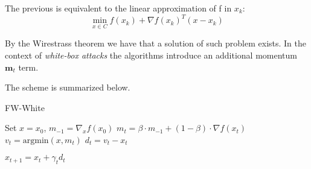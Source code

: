 \documentclass[10pt,twocolumn,letterpaper, english]{article}
\theoremstyle{definition}
\theoremstyle{plain}
\theoremstyle{plain}
\theoremstyle{plain}
\theoremstyle{plain}
\theoremstyle{remark}
\theoremstyle{remark}
\theoremstyle{definition}
\theoremstyle{definition}
\theoremstyle{definition}
\theoremstyle{definition}
\begin{document}
The previous is equivalent to the linear approximation of f in $x_k$:
\begin{equation*}
    \min_{x \in C} f(x_k) + \nabla f(x_k)^T (x-x_k)
\end{equation*}

By the Wirestrass theorem we have that a solution of such problem exists.
In the context of \textit{white-box attacks} the algorithms introduce an additional momentum $\textbf{m}_t$ term. 

The scheme is summarized below.
\begin{algorithm}
\caption{FW-White}\label{FW}
\begin{algorithmic}[1]

\State Set $x = x_0$, $m_{-1} = \nabla_x f(x_0)$
    \State $m_t = \beta \cdot m_{-1} + (1-\beta) \cdot \nabla f(x_t) $
    \State $v_t = \text{argmin} (x, m_t) $
    \State $d_t = v_t - x_t $
    
        
    \State $x_{t+1} = x_t + \gamma_t d_t $
    
    
    
\EndFor
\end{algorithmic}
\end{algorithm}
\end{document}
